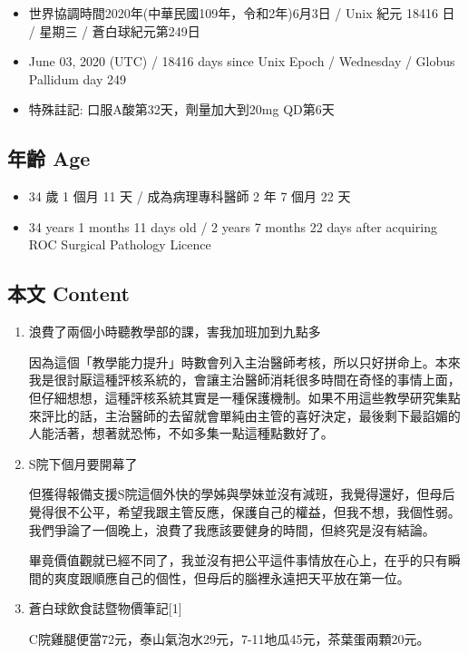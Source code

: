 \documentclass[a5paper, 11pt
]{book}
\providecommand{\tightlist}{%
  \setlength{\itemsep}{0pt}\setlength{\parskip}{0pt}}
\begin{document}
\begin{itemize}
\tightlist
\item
  世界協調時間2020年(中華民國109年，令和2年)6月3日 / Unix 紀元 18416 日
  / 星期三 / 蒼白球紀元第249日
\item
  June 03, 2020 (UTC) / 18416 days since Unix Epoch / Wednesday / Globus
  Pallidum day 249
\item
  特殊註記: 口服A酸第32天，劑量加大到20mg QD第6天
\end{itemize}

\hypertarget{ux5e74ux9f61-age-2}{%
\subsection{年齡 Age}\label{ux5e74ux9f61-age-2}}

\begin{itemize}
\tightlist
\item
  34 歲 1 個月 11 天 / 成為病理專科醫師 2 年 7 個月 22 天
\item
  34 years 1 months 11 days old / 2 years 7 months 22 days after
  acquiring ROC Surgical Pathology Licence
\end{itemize}

\hypertarget{ux672cux6587-content-2}{%
\subsection{本文 Content}\label{ux672cux6587-content-2}}

\begin{enumerate}
\def\labelenumi{\arabic{enumi}.}
\item
  浪費了兩個小時聽教學部的課，害我加班加到九點多

  因為這個「教學能力提升」時數會列入主治醫師考核，所以只好拼命上。本來我是很討厭這種評核系統的，會讓主治醫師消耗很多時間在奇怪的事情上面，但仔細想想，這種評核系統其實是一種保護機制。如果不用這些教學研究集點來評比的話，主治醫師的去留就會單純由主管的喜好決定，最後剩下最諂媚的人能活著，想著就恐怖，不如多集一點這種點數好了。
\item
  S院下個月要開幕了

  但獲得報備支援S院這個外快的學姊與學妹並沒有減班，我覺得還好，但母后覺得很不公平，希望我跟主管反應，保護自己的權益，但我不想，我個性弱。我們爭論了一個晚上，浪費了我應該要健身的時間，但終究是沒有結論。

  畢竟價值觀就已經不同了，我並沒有把公平這件事情放在心上，在乎的只有瞬間的爽度跟順應自己的個性，但母后的腦裡永遠把天平放在第一位。
\item
  蒼白球飲食誌暨物價筆記{[}1{]}

  C院雞腿便當72元，泰山氣泡水29元，7-11地瓜45元，茶葉蛋兩顆20元。
\end{enumerate}
\end{document}

